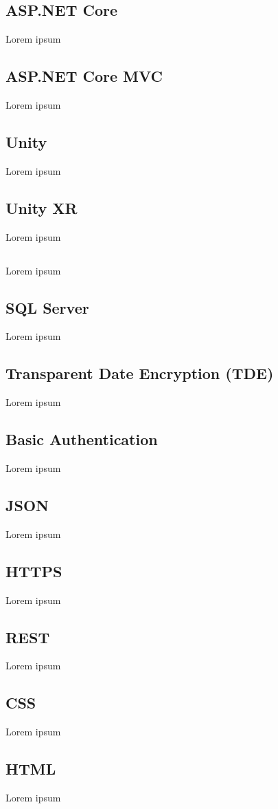 \subsection*{ASP.NET Core}

Lorem ipsum

\subsection*{ASP.NET Core MVC}
Lorem ipsum
\subsection*{Unity}
Lorem ipsum
\subsection*{Unity XR}
Lorem ipsum
\subsection*{\C}
Lorem ipsum
\subsection*{SQL Server}
Lorem ipsum
\subsection*{Transparent Date Encryption (TDE)}
Lorem ipsum
\subsection*{Basic Authentication}
Lorem ipsum
\subsection*{JSON}
Lorem ipsum
\subsection*{HTTPS}
Lorem ipsum
\subsection*{REST}
Lorem ipsum
\subsection*{CSS}
Lorem ipsum
\subsection*{HTML}
Lorem ipsum
